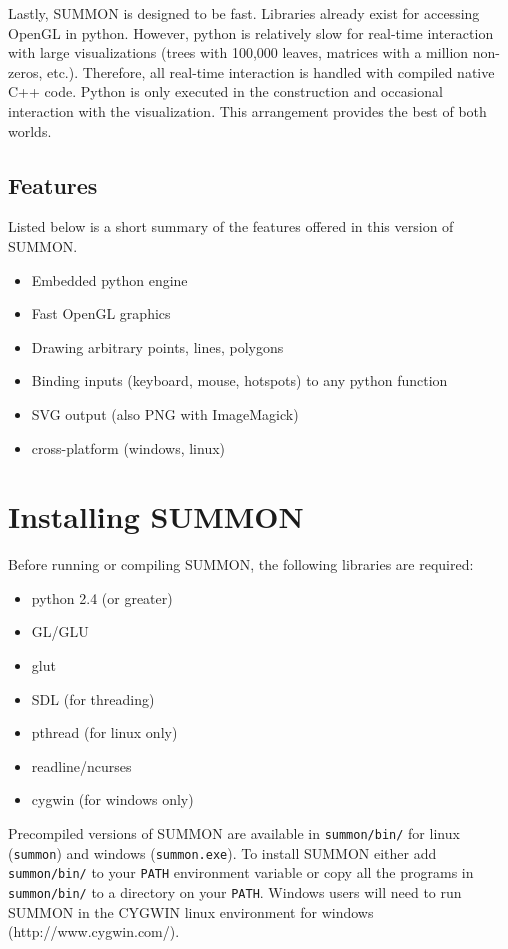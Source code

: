 \documentclass[12pt]{article}
\newcommand{\items}[1]{\begin{itemize} #1 \end{itemize}}
\newcommand{\code}[1]{{\tt #1}}
\begin{document}
Lastly, SUMMON is designed to be fast.  Libraries already exist for
accessing OpenGL in python.  However, python is relatively slow for real-time
interaction with large visualizations (trees with 100,000 leaves, matrices with
a million non-zeros, etc.).  Therefore, all real-time interaction is handled
with compiled native C++ code.  Python is only executed in the construction 
and occasional interaction with the visualization.  This arrangement provides 
the best of both worlds.




\subsection{Features}

Listed below is a short summary of the features offered in this version of
SUMMON.

\items{
    \item Embedded python engine
    \item Fast OpenGL graphics    
    \item Drawing arbitrary points, lines, polygons
    \item Binding inputs (keyboard, mouse, hotspots) to any python function 
    \item SVG output (also PNG with ImageMagick)
    \item cross-platform (windows, linux)
}

\section{Installing SUMMON}
\label{sec:installing}

Before running or compiling SUMMON, the following libraries are required:
\items {
    \item python 2.4 (or greater)
    \item GL/GLU    
    \item glut 
    \item SDL (for threading)
    \item pthread (for linux only)
    \item readline/ncurses
    \item cygwin (for windows only)
}

Precompiled versions of SUMMON are available in \code{summon/bin/} for linux
(\code{summon}) and windows (\code{summon.exe}).  To install SUMMON either add
\code{summon/bin/} to your \code{PATH} environment variable or copy all the
programs in \code{summon/bin/} to a directory on your \code{PATH}.  Windows users
will need to run SUMMON in the CYGWIN linux environment for windows 
(http://www.cygwin.com/).
\end{document}
